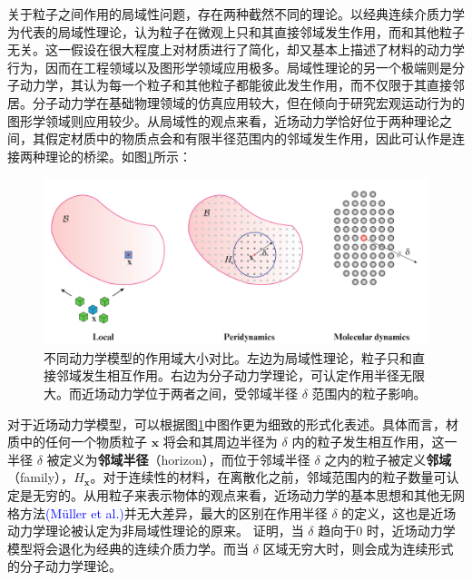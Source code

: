 关于粒子之间作用的局域性问题，存在两种截然不同的理论。以经典连续介质力学为代表的局域性理论，认为粒子在微观上只和其直接邻域发生作用，而和其他粒子无关。这一假设在很大程度上对材质进行了简化，却又基本上描述了材料的动力学行为，因而在工程领域以及图形学领域应用极多。局域性理论的另一个极端则是分子动力学，其认为每一个粒子和其他粒子都能彼此发生作用，而不仅限于其直接邻居。分子动力学在基础物理领域的仿真应用较大，但在倾向于研究宏观运动行为的图形学领域则应用较少。从局域性的观点来看，近场动力学恰好位于两种理论之间，其假定材质中的物质点会和有限半径范围内的邻域发生作用，因此可认作是连接两种理论的桥梁。如图\ref{peridynamics_comparison}所示：

\begin{figure}[htbp!]
  \centering
  \captionsetup{justification=centering}
  \includegraphics[width=\linewidth]{chap/image/peridynamics_comparison}

  \caption{\label{peridynamics_comparison}
           不同动力学模型的作用域大小对比。左边为局域性理论，粒子只和直接邻域发生相互作用。右边为分子动力学理论，可认定作用半径无限大。而近场动力学位于两者之间，受邻域半径 $\delta$ 范围内的粒子影响。
          }
\end{figure}

对于近场动力学模型，可以根据图\ref{peridynamics_comparison}中图作更为细致的形式化表述。具体而言，材质中的任何一个物质粒子 $\mathbf{x}$ 将会和其周边半径为 $\delta$ 内的粒子发生相互作用，这一半径 $\delta$ 被定义为\textbf{邻域半径}（horizon），而位于邻域半径 $\delta$ 之内的粒子被定义\textbf{邻域}（family），$H_\mathbf{x}$。对于连续性的材料，在离散化之前，邻域范围内的粒子数量可认定是无穷的。从用粒子来表示物体的观点来看，近场动力学的基本思想和其他无网格方法\textcolor{blue}{(M\"{u}ller et al.)\parencite{Muller2003}\parencite{Muller2003}}并无大差异，最大的区别在作用半径 $\delta$ 的定义，这也是近场动力学理论被认定为非局域性理论的原来。 证明，当 $\delta$ 趋向于0 时，近场动力学模型将会退化为经典的连续介质力学。而当 $\delta$ 区域无穷大时，则会成为连续形式的分子动力学理论。

